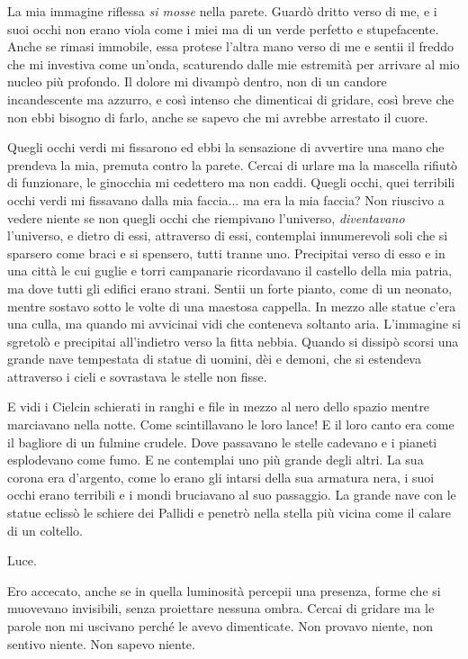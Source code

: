 La mia immagine riflessa \emph{si mosse} nella parete. Guardò dritto
verso di me, e i suoi occhi non erano viola come i miei ma di un verde
perfetto e stupefacente. Anche se rimasi immobile, essa protese l'altra
mano verso di me e sentii il freddo che mi investiva come un'onda,
scaturendo dalle mie estremità per arrivare al mio nucleo più profondo.
Il dolore mi divampò dentro, non di un candore incandescente ma azzurro,
e così intenso che dimenticai di gridare, così breve che non ebbi
bisogno di farlo, anche se sapevo che mi avrebbe arrestato il cuore.

Quegli occhi verdi mi fissarono ed ebbi la sensazione di avvertire una
mano che prendeva la mia, premuta contro la parete. Cercai di urlare ma
la mascella rifiutò di funzionare, le ginocchia mi cedettero ma non
caddi. Quegli occhi, quei terribili occhi verdi mi fissavano dalla mia
faccia... ma era la mia faccia? Non riuscivo a vedere niente se non
quegli occhi che riempivano l'universo, \emph{diventavano} l'universo, e
dietro di essi, attraverso di essi, contemplai innumerevoli soli che si
sparsero come braci e si spensero, tutti tranne uno. Precipitai verso di
esso e in una città le cui guglie e torri campanarie ricordavano il
castello della mia patria, ma dove tutti gli edifici erano strani.
Sentii un forte pianto, come di un neonato, mentre sostavo sotto le
volte di una maestosa cappella. In mezzo alle statue c'era una culla, ma
quando mi avvicinai vidi che conteneva soltanto aria. L'immagine si
sgretolò e precipitai all'indietro verso la fitta nebbia. Quando si
dissipò scorsi una grande nave tempestata di statue di uomini, dèi e
demoni, che si estendeva attraverso i cieli e sovrastava le stelle non
fisse.

E vidi i Cielcin schierati in ranghi e file in mezzo al nero dello
spazio mentre marciavano nella notte. Come scintillavano le loro lance!
E il loro canto era come il bagliore di un fulmine crudele. Dove
passavano le stelle cadevano e i pianeti esplodevano come fumo. E ne
contemplai uno più grande degli altri. La sua corona era d'argento, come
lo erano gli intarsi della sua armatura nera, i suoi occhi erano
terribili e i mondi bruciavano al suo passaggio. La grande nave con le
statue eclissò le schiere dei Pallidi e penetrò nella stella più vicina
come il calare di un coltello.

Luce.

Ero accecato, anche se in quella luminosità percepii una presenza, forme
che si muovevano invisibili, senza proiettare nessuna ombra. Cercai di
gridare ma le parole non mi uscivano perché le avevo dimenticate. Non
provavo niente, non sentivo niente. Non sapevo niente.

